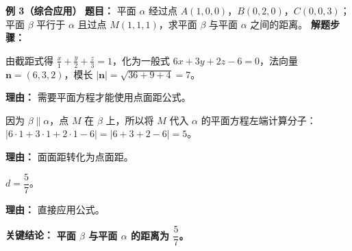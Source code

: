 \begin{examplebox}
	\medskip
	\textbf{\textcolor{CExample}{例 3（综合应用）}}
	\textbf{\textcolor{CExample}{题目：}}
	平面 $\alpha$ 经过点 $A(1,0,0)$，$B(0,2,0)$，$C(0,0,3)$；平面 $\beta$ 平行于 $\alpha$ 且过点 $M(1,1,1)$，求平面 $\beta$ 与平面 $\alpha$ 之间的距离。
	\textbf{\textcolor{CExample}{解题步骤：}}
	\begin{description}[style=nextline, leftmargin=2.8em, labelsep=0.5em, itemsep=0.45em]
		\item[\textbf{第一步（求平面方程）：}]
			由截距式得 $\frac{x}{1}+\frac{y}{2}+\frac{z}{3}=1$，化为一般式 $6x+3y+2z-6=0$，法向量 $\mathbf{n}=(6,3,2)$，模长 $|\mathbf{n}|=\sqrt{36+9+4}=7$。
			\par\textbf{理由：} 需要平面方程才能使用点面距公式。
		\item[\textbf{第二步（确认平行并代入）：}]
			因为 $\beta\parallel\alpha$，点 $M$ 在 $\beta$ 上，所以将 $M$ 代入 $\alpha$ 的平面方程左端计算分子：$|6\cdot1+3\cdot1+2\cdot1-6| = |6+3+2-6| = 5$。
			\par\textbf{理由：} 面面距转化为点面距。
		\item[\textbf{第三步（计算距离）：}]
			$d = \dfrac{5}{7}$。
			\par\textbf{理由：} 直接应用公式。
	\end{description}
	\textbf{\textcolor{CExample}{关键结论：}}
	\textbf{平面 $\beta$ 与平面 $\alpha$ 的距离为 $\dfrac{5}{7}$。}
\end{examplebox}

